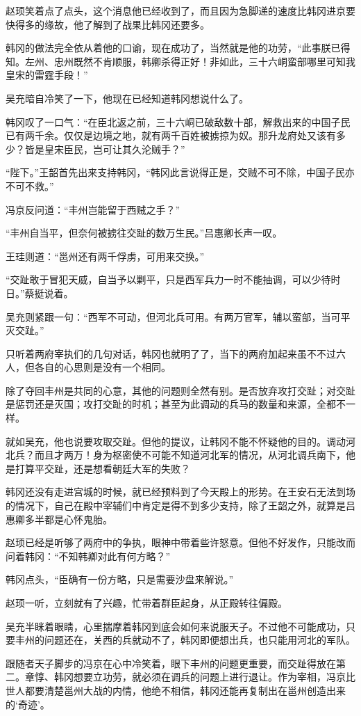 赵顼笑着点了点头，这个消息他已经收到了，而且因为急脚递的速度比韩冈进京要快得多的缘故，他了解到了战果比韩冈还要多。

韩冈的做法完全依从着他的口谕，现在成功了，当然就是他的功劳，“此事朕已得知。左州、忠州既然不肯顺服，韩卿杀得正好！非如此，三十六峒蛮部哪里可知我皇宋的雷霆手段！”

吴充暗自冷笑了一下，他现在已经知道韩冈想说什么了。

韩冈叹了一口气：“在臣北返之前，三十六峒已破敌数十部，解救出来的中国子民已有两千余。仅仅是边境之地，就有两千百姓被掳掠为奴。那升龙府处又该有多少？皆是皇宋臣民，岂可让其久沦贼手？”

“陛下。”王韶首先出来支持韩冈，“韩冈此言说得正是，交贼不可不除，中国子民亦不可不救。”

冯京反问道：“丰州岂能留于西贼之手？”

“丰州自当平，但奈何被掳往交趾的数万生民。”吕惠卿长声一叹。

王珪则道：“邕州还有两千俘虏，可用来交换。”

“交趾敢于冒犯天威，自当予以剿平，只是西军兵力一时不能抽调，可以少待时日。”蔡挺说着。

吴充则紧跟一句：“西军不可动，但河北兵可用。有两万官军，辅以蛮部，当可平灭交趾。”

只听着两府宰执们的几句对话，韩冈也就明了了，当下的两府加起来虽不不过六人，但各自的心思则是没有一个相同。

除了夺回丰州是共同的心意，其他的问题则全然有别。是否放弃攻打交趾；对交趾是惩罚还是灭国；攻打交趾的时机；甚至为此调动的兵马的数量和来源，全都不一样。

就如吴充，他也说要攻取交趾。但他的提议，让韩冈不能不怀疑他的目的。调动河北兵？而且才两万！身为枢密使不可能不知道河北军的情况，从河北调兵南下，他是打算平交趾，还是想看朝廷大军的失败？

韩冈还没有走进宫城的时候，就已经预料到了今天殿上的形势。在王安石无法到场的情况下，自己在殿中宰辅们中肯定是得不到多少支持，除了王韶之外，就算是吕惠卿多半都是心怀鬼胎。

赵顼已经是听够了两府中的争执，眼神中带着些许怒意。但他不好发作，只能改而问着韩冈：“不知韩卿对此有何方略？”

韩冈点头，“臣确有一份方略，只是需要沙盘来解说。”

赵顼一听，立刻就有了兴趣，忙带着群臣起身，从正殿转往偏殿。

吴充半眯着眼睛，心里揣摩着韩冈到底会如何来说服天子。不过他不可能成功，只要丰州的问题还在，关西的兵就动不了，韩冈即便想出兵，也只能用河北的军队。

跟随者天子脚步的冯京在心中冷笑着，眼下丰州的问题更重要，而交趾得放在第二。章惇、韩冈想要立功劳，就必须在调兵的问题上进行退让。作为宰相，冯京比世人都要清楚邕州大战的内情，他绝不相信，韩冈还能再复制出在邕州创造出来的‘奇迹’。

